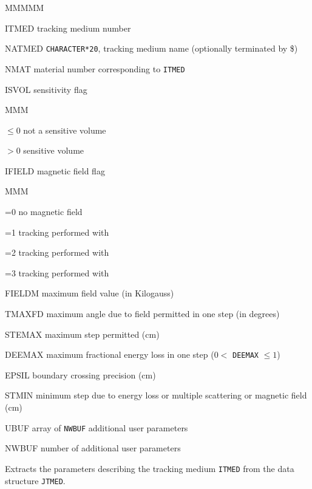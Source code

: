 \begin{DL}{MMMMM}
\item[ITMED]      tracking medium number
\item[NATMED]     {\tt CHARACTER*20}, tracking medium name (optionally 
                  terminated by \$)
\item[NMAT]       material number corresponding to {\tt ITMED}
\item[ISVOL]      sensitivity flag
\begin{DL}{MMM}
\item[$\leq$0] not a sensitive volume
\item[$>$0] sensitive volume
\end{DL}
\item[IFIELD]     magnetic field flag
\begin{DL}{MMM}
\item[=0]         no magnetic field
\item[=1]         tracking performed with 
\item[=2]         tracking performed with 
\item[=3]         tracking performed with 
\end{DL}
\item[FIELDM]     maximum field value (in Kilogauss)
\item[TMAXFD]     maximum angle due to field permitted in
                  one step (in degrees)
\item[STEMAX]     maximum step permitted (cm)
\item[DEEMAX]     maximum fractional energy loss in one step ($0<$
                  {\tt DEEMAX} $\leq 1$)
\item[EPSIL]      boundary crossing precision (cm)
\item[STMIN]      minimum step due to energy loss or multiple scattering 
                  or magnetic field (cm)
\item[UBUF]       array of {\tt NWBUF} additional user parameters
\item[NWBUF]      number of additional user parameters
\end{DL}
 
 
Extracts the parameters describing the tracking medium {\tt ITMED}
from the data structure {\tt JTMED}.
 
 
